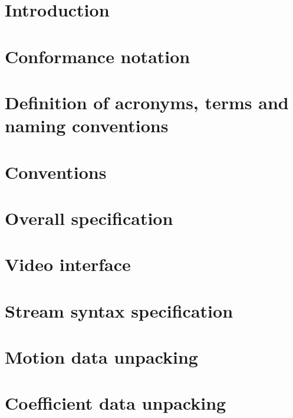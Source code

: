 
\section{Introduction}

\clearpage
\section{Conformance notation}

\clearpage
\section{Definition of acronyms, terms and naming conventions}

\clearpage
\section{Conventions}

\clearpage
\section{Overall specification}

\clearpage
\section{Video interface}

\clearpage
\section{Stream syntax specification}

\clearpage
\section{Motion data unpacking}

\clearpage
\section{Coefficient data unpacking}

